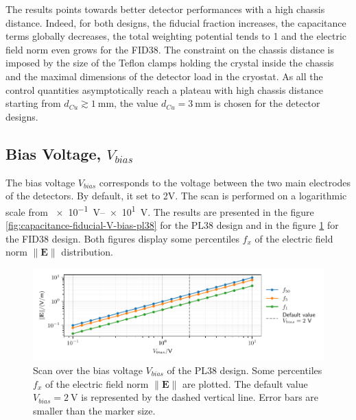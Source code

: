 The results points towards better detector performances with a high chassis distance. Indeed, for both designs, the fiducial fraction increases, the capacitance terms globally decreases, the total weighting potential tends to 1 and the electric field norm even grows for the FID38. The constraint on the chassis distance is imposed by the size of the Teflon clamps holding the crystal inside the chassis and the maximal dimensions of the detector load in the cryostat. As all the control quantities asymptotically reach a plateau with high chassis distance starting from $d_{Cu} \gtrsim \SI{1}{\mm}$, the value $d_{Cu} = \SI{3}{\mm}$ is chosen for the detector designs.



\subsection{Bias Voltage, $V_{bias}$}

The bias voltage $V_{bias}$ corresponds to the voltage between the two main electrodes of the detectors.
By default, it set to 2V. The scan is performed on a logarithmic scale from \SIrange{e-1}{e1}{\volt}. The results are presented in the figure \ref{fig:capacitance-fiducial-V-bias-pl38} for the PL38 design and in the figure \ref{fig:capacitance-fiducial-V-bias} for the FID38 design. Both figures display some percentiles $f_x$ of the electric field norm $\| \mathbf{E} \|$ distribution.

\begin{figure}
\centering
\includegraphics[scale=1]{Figures/ElectrodesScan/capacitance_fiducial_V_bias_pl38.pdf}
\caption{Scan over the bias voltage $V_{bias}$ of the PL38 design. Some percentiles $f_x$ of the electric field norm $\| \mathbf{E} \|$ are plotted. The default value $V_{bias}=\SI{2}{\volt}$ is represented by the dashed vertical line. Error bars are smaller than the marker size.}
\label{fig:capacitance-fiducial-V-bias}
\end{figure}

